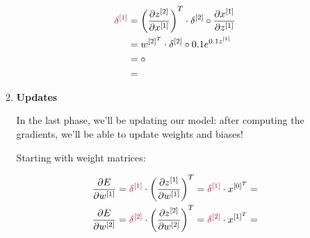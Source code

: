 \documentclass[12pt]{article}
\begin{document}
\begin{enumerate}[leftmargin=\labelsep]
\begin{enumerate}
                \begin{equation*}
                  \begin{aligned}
                    \textcolor{purple}{\delta^{[1]}} & = \left(\frac{\partial z^{[2]}}{\partial x^{[1]}}\right)^T \cdot \delta^{[2]} \circ \frac{\partial x^{[1]}}{\partial z^{[1]}} \\
                                                     & = w^{[2]^T} \cdot \delta^{[2]} \circ 0.1e^{0.1z^{[1]}}                                                                        \\
                                                     & =  \circ                                         \\
                                                     & = 
                  \end{aligned}
                \end{equation*}

          \item \textbf{Updates}

                In the last phase, we'll be updating our model: after computing the gradients,
                we'll be able to update weights and biases!

                Starting with weight matrices:

                \begin{equation*}
                  \begin{aligned}
                    \frac{\partial E}{\partial w^{[1]}} & = \textcolor{purple}{\delta^{[1]}} \cdot
                    \left(\frac{\partial z^{[1]}}{\partial w^{[1]}}\right)^T
                    = \textcolor{purple}{\delta^{[1]}} \cdot x^{[0]^T}
                    =                                             \\
                    \frac{\partial E}{\partial w^{[2]}} & = \textcolor{purple}{\delta^{[2]}} \cdot
                    \left(\frac{\partial z^{[2]}}{\partial w^{[2]}}\right)^T
                    = \textcolor{purple}{\delta^{[2]}} \cdot x^{[1]^T}
                    = 
                  \end{aligned}
                \end{equation*}


\end{enumerate}
\end{enumerate}
\end{document}
